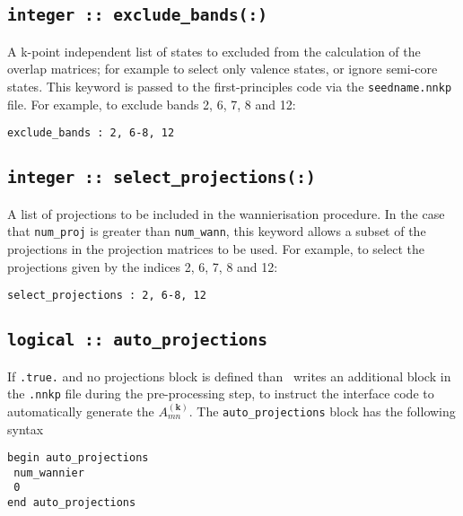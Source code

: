 \subsection[exclude\_bands]{\tt integer :: exclude\_bands(:)}

A k-point independent list of states to excluded from the calculation
 of the overlap matrices;
 for example to select only valence states, or ignore semi-core states.
 This keyword is passed to the first-principles code via the
 {\tt seedname.nnkp} file. For example, to exclude bands 2, 6, 7, 8
 and 12:

 \verb#exclude_bands : 2, 6-8, 12#

\subsection[select\_projections]{\tt integer :: select\_projections(:)}

A list of projections to be included in the wannierisation procedure.
In the case that \verb#num_proj# is greater than \verb#num_wann#,
  this keyword allows a subset of the projections in the projection matrices to be used.
For example, to select the projections given by the indices 2, 6, 7, 8 and 12:

 \verb#select_projections : 2, 6-8, 12#

\subsection[auto\_projections]{\tt logical :: auto\_projections}

If {\tt .true.} and no projections block is defined than \wannier\ writes an additional block in the {\tt .nnkp} file during the pre-processing step, to instruct the interface code to automatically generate the $A_{mn}^{(\mathbf{k})}$. The {\tt auto\_projections} block has the following syntax

\noindent \verb#begin auto_projections# \\
 \verb# num_wannier# \\
 \verb# 0# \\
 \verb#end auto_projections#


